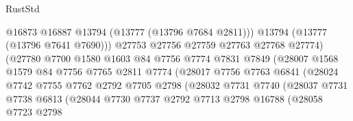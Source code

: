 \begin{lexlean}{RustStd}
\begin{coremodule}
                                      @16873
                                      @16887
                                      @13794
                                      (@13777 (@13796 @7684 @2811)))
                                    @13794
                                    (@13777 (@13796 @7641 @7690)))
                                  @27753
                                  @27756
                                  @27759
                                  @27763
                                  @27768
                                  @27774)
                                (@27780
                                  @7700
                                  @1580
                                  @1603
                                  @84
                                  @7756
                                  @7774
                                  @7831
                                  @7849
                                  (@28007
                                    @1568
                                    @1579
                                    @84
                                    @7756
                                    @7765
                                    @2811
                                    @7774
                                    (@28017
                                      @7756
                                      @7763
                                      @6841
                                      (@28024
                                        @7742
                                        @7755
                                        @7762
                                        @2792
                                        @7705
                                        @2798
                                        (@28032
                                          @7731
                                          @7740
                                          (@28037
                                            @7731
                                            @7738
                                            @6813
                                            (@28044
                                              @7730
                                              @7737
                                              @2792
                                              @7713
                                              @2798
                                              @16788
                                              (@28058
                                                @7723
                                                @2798

\end{coremodule}
\end{lexlean}
